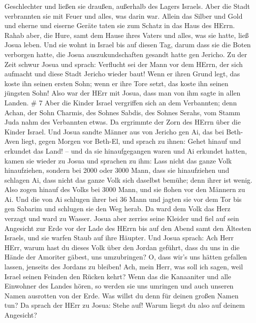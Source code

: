 Geschlechter und ließen sie draußen, außerhalb des Lagers Israels.
 Aber die Stadt verbrannten sie mit Feuer und alles, was
darin war. Allein das Silber und Gold und eherne und eiserne Geräte
taten sie zum Schatz in das Haus des HErrn.  Rahab aber,
die Hure, samt dem Hause ihres Vaters und alles, was sie hatte, ließ
Josua leben. Und sie wohnt in Israel bis auf diesen Tag, darum dass sie
die Boten verborgen hatte, die Josua auszukundschaften gesandt hatte gen
Jericho.  Zu der Zeit schwur Josua und sprach: Verflucht
sei der Mann vor dem HErrn, der sich aufmacht und diese Stadt Jericho
wieder baut! Wenn er ihren Grund legt, das koste ihn seinen ersten Sohn;
wenn er ihre Tore setzt, das koste ihn seinen jüngsten Sohn!
 Also war der HErr mit Josua, dass man von ihm sagte in
allen Landen. \# 7  Aber die Kinder Israel vergriffen sich
an dem Verbannten; denn Achan, der Sohn Charmis, des Sohnes Sabdis, des
Sohnes Serahs, vom Stamm Juda nahm des Verbannten etwas. Da ergrimmte
der Zorn des HErrn über die Kinder Israel.  Und Josua sandte
Männer aus von Jericho gen Ai, das bei Beth-Aven liegt, gegen Morgen vor
Beth-El, und sprach zu ihnen: Gehet hinauf und erkundet das Land! -- und
da sie hinaufgegangen waren und Ai erkundet hatten,  kamen
sie wieder zu Josua und sprachen zu ihm: Lass nicht das ganze Volk
hinaufziehen, sondern bei 2000 oder 3000 Mann, dass sie hinaufziehen und
schlagen Ai, dass nicht das ganze Volk sich daselbst bemühe; denn ihrer
ist wenig.  Also zogen hinauf des Volks bei 3000 Mann, und
sie flohen vor den Männern zu Ai.  Und die von Ai schlugen
ihrer bei 36 Mann und jagten sie vor dem Tor bis gen Sabarim und
schlugen sie den Weg herab. Da ward dem Volk das Herz verzagt und ward
zu Wasser.  Josua aber zerriss seine Kleider und fiel auf
sein Angesicht zur Erde vor der Lade des HErrn bis auf den Abend samt
den Ältesten Israels, und sie warfen Staub auf ihre Häupter.
 Und Josua sprach: Ach Herr HErr, warum hast du dieses Volk
über den Jordan geführt, dass du uns in die Hände der Amoriter gäbest,
uns umzubringen? O, dass wir's uns hätten gefallen lassen, jenseits des
Jordans zu bleiben!  Ach, mein Herr, was soll ich sagen,
weil Israel seinen Feinden den Rücken kehrt?  Wenn das die
Kanaaniter und alle Einwohner des Landes hören, so werden sie uns
umringen und auch unseren Namen ausrotten von der Erde. Was willst du
denn für deinen großen Namen tun?  Da sprach der HErr zu
Josua: Stehe auf! Warum liegst du also auf deinem Angesicht?
